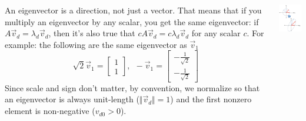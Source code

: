 \documentclass{beamer}
\begin{document}
\begin{frame}
  \begin{columns}[t]
    \column{2.75in}
    \begin{block}{}
        An eigenvector is a direction, not just a vector.  That means
        that if you multiply an eigenvector by any scalar, you get the
        same eigenvector: if $A\vec{v}_d=\lambda_d\vec{v}_d$, then it’s
        also true that $cA\vec{v}_d=c\lambda_d\vec{v}_d$ for any scalar $c$.
        For example: the following are the same eigenvector as $\vec{v}_1$
        \[
        \sqrt{2}\vec{v}_1=\left[\begin{array}{c}1\\1\end{array}\right],~~
        -\vec{v}_1=\left[\begin{array}{c}-\frac{1}{\sqrt{2}}\\-\frac{1}{\sqrt{2}}\end{array}\right]
        \]
        Since scale and sign don't matter, by convention, we normalize so that 
        an eigenvector is always unit-length ($\Vert\vec{v}_d\Vert=1$) and
        the first nonzero element is non-negative ($v_{d0}>0$).
    \end{block}
    \column{1.5in}
    \begin{block}{}
      \includegraphics[width=1.45in]{linalg_review_fig2.png}
    \end{block}
  \end{columns}
\end{frame}
\end{document}
